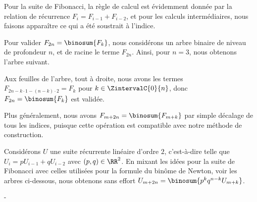Pour la suite de Fibonacci, la règle de calcul est évidemment donnée par la relation de récurrence $F_{i} = F_{i-1} + F_{i-2}$, et pour les calculs intermédiaires, nous faisons apparaître ce qui a été soustrait à l'indice.

%
            {\intertree}{}

Pour valider $F_{2n} = \binosum{F_k}$, nous considérons un arbre binaire de niveau de profondeur $n$, et de racine le terme $F_{2n}$.
Ainsi, pour $n=3$, nous obtenons l'arbre suivant.


Aux feuilles de l'arbre, tout à droite, nous avons les termes 
$F_{2n - k\cdot1 - (n-k)\cdot2} = F_k$
pour $k \in \ZintervalC{0}{n}$,
donc
$F_{2n} = \binosum{F_k}$ est validée.


\begin{remark}
	Plus généralement, nous avons
	$F_{m+2n} = \binosum{F_{m+k}}$
	par simple décalage de tous les indices,
	puisque cette opération est compatible avec notre méthode de construction.
\end{remark}




\begin{remark}
	Considérons $U$ une suite récurrente linéaire d'ordre $2$,
	c'est-à-dire telle que
	$U_{i} = p U_{i-1} + q U_{i-2}$ avec $(p, q) \in \RR^2$.
	En mixant les idées pour la suite de Fibonacci avec celles utilisées pour la formule du binôme de Newton, voir les arbres ci-dessous, nous obtenons sans effort
	$U_{m+2n} = \binosum{p^k q^{n-k} U_{m+k}}$.

    	        {\intertree}{}-
\end{remark}
